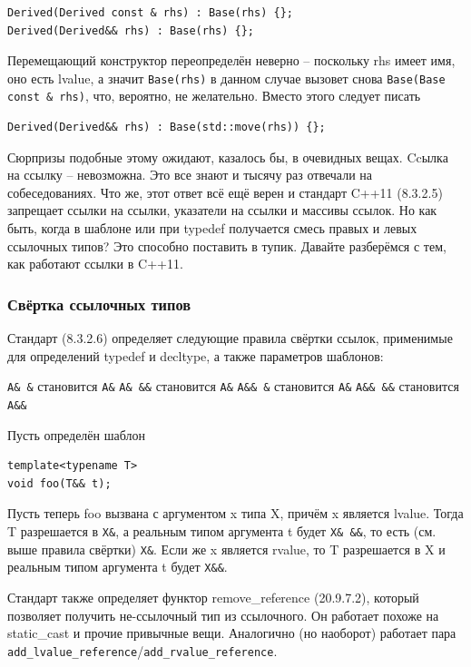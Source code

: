 \documentclass[a4paper,12pt,oneside]{article}
\begin{document}
\begin{lstlisting}
Derived(Derived const & rhs) : Base(rhs) {};
Derived(Derived&& rhs) : Base(rhs) {};
\end{lstlisting}

Перемещающий конструктор переопределён неверно -- поскольку rhs имеет имя, оно есть lvalue, а значит \lstinline!Base(rhs)! в данном случае вызовет снова \lstinline!Base(Base const & rhs)!, что, вероятно, не желательно. Вместо этого следует писать

\begin{lstlisting}
Derived(Derived&& rhs) : Base(std::move(rhs)) {};
\end{lstlisting}

Сюрпризы подобные этому ожидают, казалось бы, в очевидных вещах. Ccылка на ссылку -- невозможна. Это все знают и тысячу раз отвечали на собеседованиях. Что же, этот ответ всё ещё верен и стандарт C++11 (8.3.2.5) запрещает ссылки на ссылки, указатели на ссылки и массивы ссылок. Но как быть, когда в шаблоне или при typedef получается смесь правых и левых ссылочных типов? Это способно поставить в тупик. Давайте разберёмся с тем, как работают ссылки в C++11.

\subsubsection{Свёртка ссылочных типов}

Стандарт (8.3.2.6) определяет следующие правила свёртки ссылок, применимые для определений typedef и decltype, а также параметров шаблонов:

\lstinline!A& &! становится \lstinline!A&!
\lstinline!A& &&! становится \lstinline!A&!
\lstinline!A&& &! становится \lstinline!A&!
\lstinline!A&& &&! становится \lstinline!A&&!

Пусть определён шаблон

\begin{lstlisting}
template<typename T>
void foo(T&& t);
\end{lstlisting}

Пусть теперь foo вызвана с аргументом x типа X, причём x является lvalue. Тогда T разрешается в \lstinline!X&!, а реальным типом аргумента t будет \lstinline!X& &&!, то есть (см. выше правила свёртки) \lstinline!X&!. Если же x является rvalue, то T разрешается в X и реальным типом аргумента t будет \lstinline!X&&!.

Стандарт также определяет функтор remove\_reference (20.9.7.2), который позволяет получить не-ссылочный тип из ссылочного. Он работает похоже на static\_cast и прочие привычные вещи. Аналогично (но наоборот) работает пара \lstinline!add_lvalue_reference!/\lstinline!add_rvalue_reference!.
\end{document}
